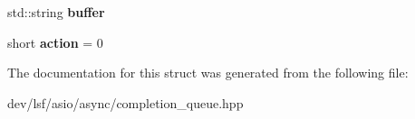 \begin{DoxyCompactItemize}
\item 
\hypertarget{structlsf_1_1asio_1_1async_1_1CompletionQueue_1_1WriteCompletionFunc_a7ba3e2090893de04ac3232feb2640b59}{
std::string {\bfseries buffer}}
\label{structlsf_1_1asio_1_1async_1_1CompletionQueue_1_1WriteCompletionFunc_a7ba3e2090893de04ac3232feb2640b59}

\item 
\hypertarget{structlsf_1_1asio_1_1async_1_1CompletionQueue_1_1WriteCompletionFunc_a3129ea9181ec140fb36e3a6f03f38f69}{
short {\bfseries action} = 0}
\label{structlsf_1_1asio_1_1async_1_1CompletionQueue_1_1WriteCompletionFunc_a3129ea9181ec140fb36e3a6f03f38f69}

\end{DoxyCompactItemize}


The documentation for this struct was generated from the following file:\begin{DoxyCompactItemize}
\item 
dev/lsf/asio/async/completion\_\-queue.hpp\end{DoxyCompactItemize}
